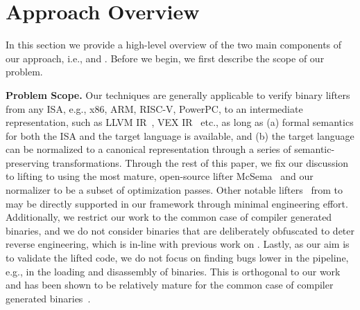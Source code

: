 \section{Approach Overview}\label{sec:Approach}

In this section we provide a high-level overview of the two main components of
our approach, i.e., \siv and \plv. Before we begin, we first describe the
scope of our problem.

\textbf{Problem Scope.} Our techniques are generally applicable to verify
binary lifters from any ISA, e.g., x86, ARM, RISC-V, PowerPC, to an
intermediate representation, such as LLVM IR~\cite{LLVM:CGO04}, VEX
IR~\cite{Valgrind:ENTCS03} etc., as long as (a) formal semantics for both the
ISA and the target language is available, and (b) the target language can be
normalized to a canonical representation through a series of
semantic-preserving transformations.  Through the rest of this paper, we fix
our discussion to lifting \ISA to \LLVM using the most mature, open-source
lifter McSema~\cite{McSema:Recon14} and our normalizer to be a subset of \LLVM
optimization passes.  Other notable lifters~\cite{FCD,DiFederico:CC2017} from
\ISA to \LLVM may be directly supported in our framework through minimal
engineering effort. Additionally, we restrict our work to the common case of
compiler generated binaries, and we do not consider binaries that are
deliberately obfuscated to deter reverse engineering, which is in-line with
previous work on \tv.  Lastly, as our aim is to validate the lifted code, we
do not focus on finding bugs lower in the pipeline, e.g., in the loading and
disassembly of binaries.  This is orthogonal to our work and has been shown to
be relatively mature for the common case of compiler generated
binaries~\cite{197147}.



